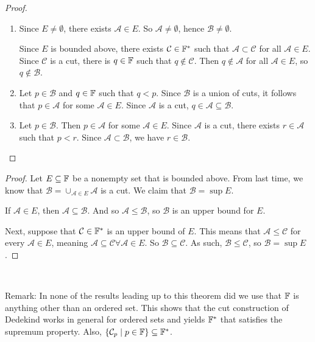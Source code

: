 \documentclass{report}
\begin{document}
\begin{proof}
    \begin{enumerate}
        \item Since $E \neq \emptyset$, there exists $\mathcal A \in E$. So $\mathcal A \neq \emptyset$, hence $\mathcal B \neq \emptyset$. 
        
        Since $E$ is bounded above, there exists $\mathcal C \in \FF^*$ such that $\mathcal A \subset \mathcal C$ for all $\mathcal A \in E$. Since $\mathcal C$ is a cut, there is $q \in \FF$ such that $q \notin \mathcal C$. Then $q \notin \mathcal A$ for all $\mathcal A \in E$, so $q \notin \mathcal B$.
        \item Let $p \in \mathcal B$ and $q \in \FF$ such that $q < p$. Since $\mathcal B$ is a union of cuts, it follows that $p \in \mathcal A$ for some $\mathcal A \in E$. Since $\mathcal A$ is a cut, $q \in \mathcal A \subseteq \mathcal B$.
        \item Let $p \in \mathcal B$. Then $p \in \mathcal A$ for some $\mathcal A \in E$. Since $\mathcal A$ is a cut, there exists $r \in \mathcal A$ such that $p < r$. Since $\mathcal A \subset \mathcal B$, we have $r \in \mathcal B$.
    \end{enumerate}
\end{proof}

\begin{proof}
    Let $E \subseteq \FF$ be a nonempty set that is bounded above.  From last time, we know that $\mathcal B = \cup_{\mathcal A \in E} \mathcal A$ is a cut. We claim that $\mathcal B = \sup E$. 

    If $\mathcal A \in E$, then $\mathcal A \subseteq \mathcal B$. And so $\mathcal A \leq \mathcal B$, so $\mathcal B$ is an upper bound for $E$.

    Next, suppose that $\mathcal C \in \FF^*$ is an upper bound of $E$. This means that $\mathcal A \leq \mathcal C$ for every $\mathcal A \in E$, meaning $\mathcal A \subseteq \mathcal C \forall \mathcal A \in E$. So $\mathcal B \subseteq \mathcal C$. As such, $\mathcal B \leq \mathcal C$, so $\mathcal B = \sup E$.
\end{proof}\

\noindent Remark: In none of the results leading up to this theorem did we use that $\FF$ is anything other than an ordered set. This shows that the cut construction of Dedekind works in general for ordered sets and yields $\FF^*$ that satisfies the supremum property. Also, $\{ \mathcal C_p \mid p \in \FF\} \subseteq \FF^*$. 
\end{document}
